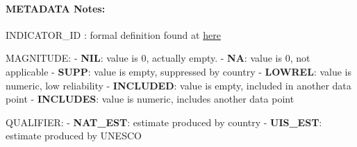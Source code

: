 \documentclass[
]{article}
\begin{document}
\hypertarget{metadata-notes}{%
\paragraph{METADATA Notes:}\label{metadata-notes}}

INDICATOR\_ID : formal definition found at
\href{http://uis.unesco.org/en/glossary}{here}

MAGNITUDE: - \textbf{NIL}: value is 0, actually empty. - \textbf{NA}:
value is 0, not applicable - \textbf{SUPP}: value is empty, suppressed
by country - \textbf{LOWREL}: value is numeric, low reliability -
\textbf{INCLUDED}: value is empty, included in another data point -
\textbf{INCLUDES}: value is numeric, includes another data point

QUALIFIER: - \textbf{NAT\_EST}: estimate produced by country -
\textbf{UIS\_EST}: estimate produced by UNESCO
\end{document}
